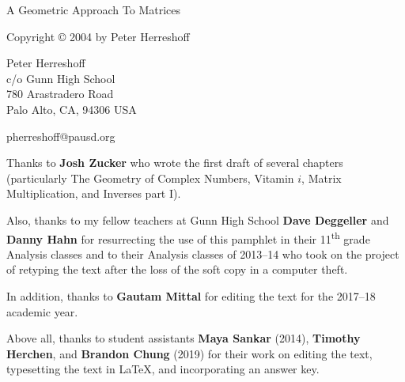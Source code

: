 \documentclass[../gatm.tex]{subfiles}
\begin{document}
\newcommand\dnew{\vspace{1cm}}

\begin{center}
	\vspace*{\fill}

	\doublespacing
	A Geometric Approach To Matrices

	Copyright \copyright{} 2004 by Peter Herreshoff  %

	\vspace{1cm}

	Peter Herreshoff\\
	c/o Gunn High School\\
	780 Arastradero Road\\
	Palo Alto, CA, 94306 USA

	\vspace{.5cm}

	pherreshoff@pausd.org

	\vspace{1cm}
\end{center}

\noindent Thanks to \textbf{Josh Zucker} who wrote the first draft of several chapters (particularly The Geometry of Complex Numbers, Vitamin $i$, Matrix Multiplication, and Inverses part I).

Also, thanks to my fellow teachers at Gunn High School \textbf{Dave Deggeller} and \textbf{Danny Hahn} for resurrecting the use of this pamphlet in their 11\textsuperscript{th} grade Analysis classes and to their Analysis classes of 2013--14 who took on the project of retyping the text after the loss of the soft copy in a computer theft.

In addition, thanks to \textbf{Gautam Mittal} for editing the text for the 2017--18 academic year.

Above all, thanks to student assistants \textbf{Maya Sankar} (2014), \textbf{Timothy Herchen}, and \textbf{Brandon Chung} (2019) for their work on editing the text, typesetting the text in \LaTeX{}, and incorporating an answer key.

\vspace*{\fill}
\end{document}
